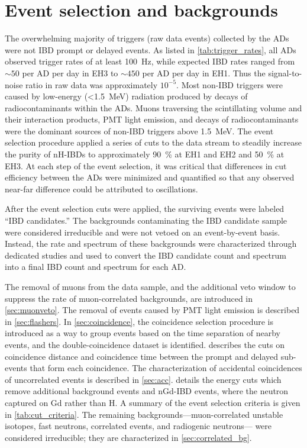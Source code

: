\chapter{Event selection and backgrounds}
\label{ch:event_selection}

The overwhelming majority of triggers (raw data events) collected by the ADs
were not IBD prompt or delayed events.
As listed in \cref{tab:trigger_rates}, all ADs observed trigger rates
of at least \SI{100}{\Hz},
while expected IBD rates ranged from $\sim50$ per AD per day in EH3
to $\sim450$ per AD per day in EH1.
Thus the signal-to-noise ratio in raw data was approximately $10^{-5}$.
Most non-IBD triggers were caused by low-energy (\SI{<1.5}{\MeV}) radiation
produced by decays of radiocontaminants within the ADs.
Muons traversing the scintillating volume and their interaction products,
PMT light emission,
and decays of radiocontaminants
were the dominant sources of non-IBD triggers above \SI{1.5}{\MeV}.
The event selection procedure applied a series of cuts to the data stream
to steadily increase the purity of nH-IBDs
to approximately \SI{90}{\percent} at EH1 and EH2
and \SI{50}{\percent} at EH3.
At each step of the event selection, it was critical that
differences in cut efficiency between the ADs were
minimized and quantified so that any observed near-far difference
could be attributed to \nuebar{} oscillations.

After the event selection cuts were applied,
the surviving events were labeled ``IBD candidates.''
The backgrounds contaminating the IBD candidate sample
were considered irreducible and were not vetoed on an event-by-event basis.
Instead, the rate and spectrum of these backgrounds were characterized
through dedicated studies
and used to convert the IBD candidate count and spectrum
into a final IBD count and spectrum for each AD.

The removal of muons from the data sample, and the additional veto window
to suppress the rate of muon-correlated backgrounds,
are introduced in \cref{sec:muonveto}.
The removal of events caused by PMT light emission
is described in \cref{sec:flashers}.
In \cref{sec:coincidence}, the coincidence selection procedure
is introduced as a way to group events based on
the time separation of nearby events,
and the double-coincidence dataset is identified.
 describes the cuts on coincidence distance and coincidence time
between the prompt and delayed sub-events that form each coincidence.
The characterization of
accidental coincidences of uncorrelated events
is described in \cref{sec:acc}.
 details the energy cuts
which remove additional background events
and nGd-IBD events, where the neutron captured on Gd rather than H.
A summary of the event selection criteria is given in \cref{tab:cut_criteria}.
The remaining backgrounds---muon-correlated unstable isotopes,
fast neutrons, \amc{} correlated events, and radiogenic neutrons---%
were considered irreducible;
they are characterized in \cref{sec:correlated_bg}.

